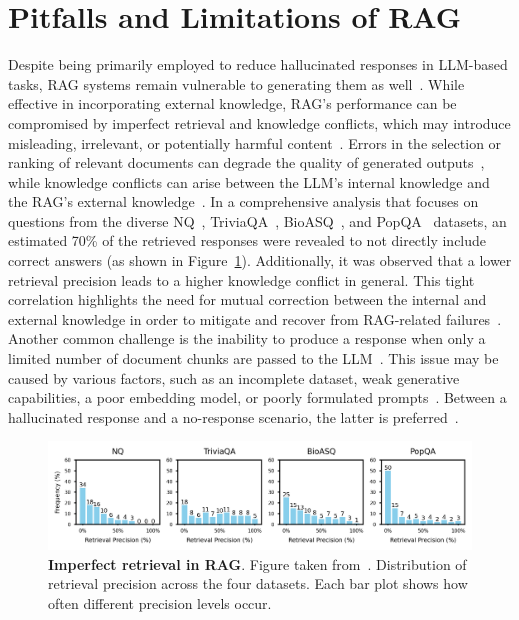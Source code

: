 \documentclass{DESSThesis}
\begin{document}
\section{Pitfalls and Limitations of RAG} \label{rag_weaknesses}

Despite being primarily employed to reduce hallucinated responses in LLM-based tasks, RAG systems remain vulnerable to generating them as well~\cite{10921633}. While effective in incorporating external knowledge, RAG's performance can be compromised by imperfect retrieval and knowledge conflicts, which may introduce misleading, irrelevant, or potentially harmful content~\cite{wang2025astuteragovercomingimperfect,10921633}. Errors in the selection or ranking of relevant documents can degrade the quality of generated outputs~\cite{10.1145/3701716.3715490}, while knowledge conflicts can arise between the LLM's internal knowledge and the RAG's external knowledge~\cite{wang2025astuteragovercomingimperfect}. In a comprehensive analysis that focuses on questions from the diverse NQ~\cite{kwiatkowski2019natural}, TriviaQA~\cite{joshi2017triviaqa}, BioASQ~\cite{tsatsaronis2015overview}, and PopQA~\cite{mallen2023not} datasets, an estimated 70\% of the retrieved responses were revealed to not directly include correct answers (as shown in Figure~\ref{fig:RAG_retrieval_precision}). Additionally, it was observed that a lower retrieval precision leads to a higher knowledge conflict in general. This tight correlation highlights the need for mutual correction between the internal and external knowledge in order to mitigate and recover from RAG-related failures~\cite{wang2025astuteragovercomingimperfect}. Another common challenge is the inability to produce a response when only a limited number of document chunks are passed to the LLM~\cite{10921633}. This issue may be caused by various factors, such as an incomplete dataset, weak generative capabilities, a poor embedding model, or poorly formulated prompts~\cite{10921633}. Between a hallucinated response and a no-response scenario, the latter is preferred~\cite{10921633}.

\begin{figure}[h]
    \centering
    \includegraphics[width=1\linewidth]{img/Related Work/RAG_retrieval_precision.png}
    \caption[Imperfect retrieval in RAG]{\textbf{Imperfect retrieval in RAG}. Figure taken from~\cite{wang2025astuteragovercomingimperfect}. Distribution of retrieval precision across the four datasets. Each bar plot shows how often different precision levels occur.}
    \label{fig:RAG_retrieval_precision}
\end{figure}
\end{document}
